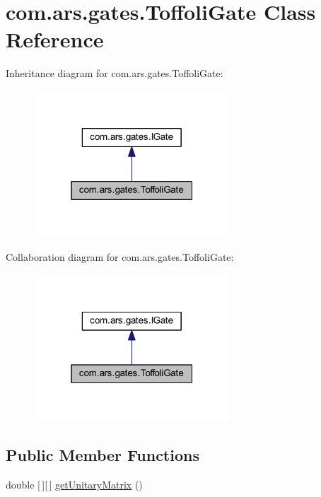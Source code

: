 \hypertarget{classcom_1_1ars_1_1gates_1_1_toffoli_gate}{}\section{com.\+ars.\+gates.\+Toffoli\+Gate Class Reference}
\label{classcom_1_1ars_1_1gates_1_1_toffoli_gate}


Inheritance diagram for com.\+ars.\+gates.\+Toffoli\+Gate\+:\nopagebreak
\begin{figure}[H]
\begin{center}
\leavevmode
\includegraphics[width=208pt]{classcom_1_1ars_1_1gates_1_1_toffoli_gate__inherit__graph}
\end{center}
\end{figure}


Collaboration diagram for com.\+ars.\+gates.\+Toffoli\+Gate\+:\nopagebreak
\begin{figure}[H]
\begin{center}
\leavevmode
\includegraphics[width=208pt]{classcom_1_1ars_1_1gates_1_1_toffoli_gate__coll__graph}
\end{center}
\end{figure}
\subsection*{Public Member Functions}
\begin{DoxyCompactItemize}
\item 
double \mbox{[}$\,$\mbox{]}\mbox{[}$\,$\mbox{]} \hyperlink{classcom_1_1ars_1_1gates_1_1_toffoli_gate_a0c253237312f11c98ffea807d63f925c}{get\+Unitary\+Matrix} ()
\end{DoxyCompactItemize}


